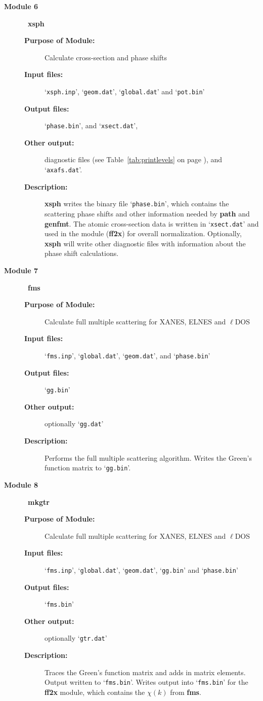 \documentclass[11pt,oneside]{report} %
\newcommand{\file}[1]{`\texttt{#1}'}
\newcommand{\module}[1]{\textrm{\bf{#1}}}
\begin{document}
\begin{latexonly}
\begin{description}
\begin{description}
  \end{description}
\item [\large\textbf{Module 6}]\dotfill\  {\large\module{xsph}}
  \begin{description}
  \item[\textbf{Purpose of Module:}] Calculate cross-section and phase shifts
  \item[\textbf{Input files:}] \file{xsph.inp}, \file{geom.dat},
    \file{global.dat} and \file{pot.bin}
  \item[\textbf{Output files:}] \file{phase.bin}, and \file{xsect.dat},
  \item[\textbf{Other output:}] diagnostic files (see
  Table~\ref{tab:printlevels} on page \pageref{tab:printlevels}),
    and \file{axafs.dat}.
  \item[\textbf{Description:}]  \module{xsph} writes the binary file
    \file{phase.bin}, which contains the scattering phase shifts and
    other information needed by \module{path} and \module{genfmt}. 
    The  atomic  cross-section data is written in \file{xsect.dat} and
    used in the module (\module{ff2x}) for overall normalization.
    Optionally, \module{xsph} will write other diagnostic files with 
    information about the phase shift calculations.
  \end{description}
\item [\large\textbf{Module 7}]\dotfill\  {\large\module{fms}}
  \begin{description}
  \item[\textbf{Purpose of Module:}] Calculate full multiple
  scattering for XANES, ELNES and $\ell$DOS
  \item[\textbf{Input files:}] \file{fms.inp}, \file{global.dat},
     \file{geom.dat}, and \file{phase.bin}
  \item[\textbf{Output files:}] \file{gg.bin}
  \item[\textbf{Other output:}] optionally \file{gg.dat}
  \item[\textbf{Description:}]  Performs the full multiple scattering
    algorithm.  Writes the Green's function matrix to \file{gg.bin}.
  \end{description}
\item [\large\textbf{Module 8}]\dotfill\  {\large\module{mkgtr}}
  \begin{description}
  \item[\textbf{Purpose of Module:}] Calculate full multiple
  scattering for XANES, ELNES and $\ell$DOS
  \item[\textbf{Input files:}] \file{fms.inp}, \file{global.dat},
     \file{geom.dat}, \file{gg.bin} and \file{phase.bin}
  \item[\textbf{Output files:}] \file{fms.bin}
  \item[\textbf{Other output:}] optionally \file{gtr.dat}
  \item[\textbf{Description:}]  Traces the Green's function matrix and adds in
  matrix elements.  Output written to \file{fms.bin}.
    Writes output into \file{fms.bin} for the \module{ff2x} module, which
    contains the $\chi(k)$ from \module{fms}.


\end{description}
\end{description}
\end{latexonly}
\end{document}

